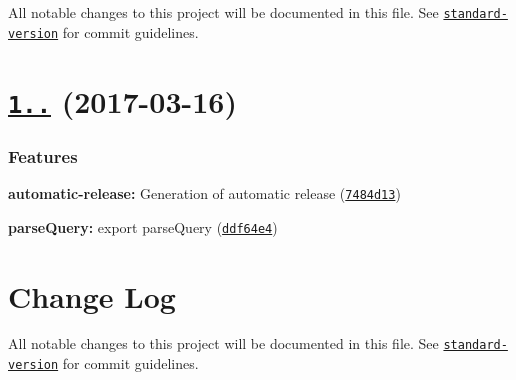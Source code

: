 All notable changes to this project will be documented in this file. See \href{https://github.com/conventional-changelog/standard-version}{\tt standard-\/version} for commit guidelines.

\label{_1.1.0}%
 \section*{\href{https://github.com/webpack/loader-utils/compare/v1.0.4...v1.1.0}{\tt 1..} (2017-\/03-\/16)}

\subsubsection*{Features}


\begin{DoxyItemize}
\item {\bfseries automatic-\/release\+:} Generation of automatic release (\href{https://github.com/webpack/loader-utils/commit/7484d13}{\tt 7484d13})
\item {\bfseries parse\+Query\+:} export parse\+Query (\href{https://github.com/webpack/loader-utils/commit/ddf64e4}{\tt ddf64e4})
\end{DoxyItemize}

\section*{Change Log}

All notable changes to this project will be documented in this file. See \href{https://github.com/conventional-changelog/standard-version}{\tt standard-\/version} for commit guidelines. 